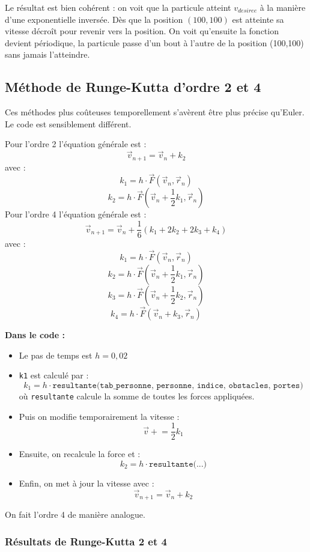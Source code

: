 \documentclass[a4paper,12pt]{article}
\begin{document}
Le résultat est bien cohérent : on voit que la particule atteint $v_{desiree}$ à la manière d'une exponentielle inversée. Dès que la position $(100,100)$ est atteinte sa vitesse décroît pour revenir vers la position. On voit qu'ensuite la fonction devient périodique, la particule passe d'un bout à l'autre de la position (100,100) sans jamais l'atteindre.


\subsection*{Méthode de Runge-Kutta d'ordre 2 et 4}

Ces méthodes plus coûteuses temporellement s'avèrent être plus précise qu'Euler. Le code est sensiblement différent.

Pour l'ordre 2 l'équation générale est :
\[
\vec{v}_{n+1} = \vec{v}_n + k_2
\]
avec :
\[
k_1 = h \cdot \vec{F}(\vec{v}_n, \vec{r}_n)
\]
\[
k_2 = h \cdot \vec{F} \left( \vec{v}_n + \frac{1}{2}k_1, \vec{r}_n \right)
\]
Pour l'ordre 4 l'équation générale est :
\[
\vec{v}_{n+1} = \vec{v}_n + \frac{1}{6}(k_1+2k_2+2k_3+k_4)
\]
avec :
\[
k_1 = h \cdot \vec{F}(\vec{v}_n, \vec{r}_n)
\]
\[
k_2 = h \cdot \vec{F} \left( \vec{v}_n + \frac{1}{2}k_1, \vec{r}_n \right)
\]
\[
k_3 = h \cdot \vec{F} \left( \vec{v}_n + \frac{1}{2}k_2, \vec{r}_n \right)
\]
\[
k_4 = h \cdot \vec{F} \left( \vec{v}_n + k_3, \vec{r}_n \right)
\]

\textbf{Dans le code :}
\begin{itemize}
    \item Le pas de temps est $h = 0{,}02$
    \item \texttt{k1} est calculé par :
    \[
    k_1 = h \cdot \texttt{resultante(tab\_personne, personne, indice, obstacles, portes)}
    \]
    où \texttt{resultante} calcule la somme de toutes les forces appliquées.
    \item Puis on modifie temporairement la vitesse :
    \[
    \vec{v} \mathrel{+}= \frac{1}{2} k_1
    \]
    \item Ensuite, on recalcule la force et :
    \[
    k_2 = h \cdot \texttt{resultante(...)}
    \]
    \item Enfin, on met à jour la vitesse avec :
    \[
    \vec{v}_{n+1} = \vec{v}_n + k_2
    \]
\end{itemize}
On fait l'ordre 4 de manière analogue.

\subsubsection{Résultats de Runge-Kutta 2 et 4}
\end{document}

